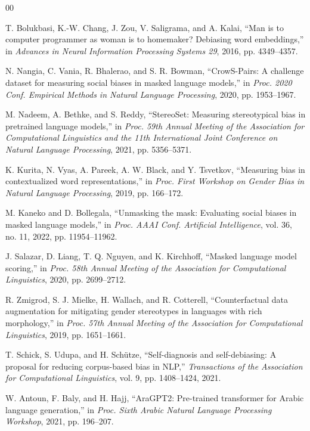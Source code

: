 \documentclass[conference]{IEEEtran}
\begin{document}
\begin{thebibliography}{00}

T. Bolukbasi, K.-W. Chang, J. Zou, V. Saligrama, and A. Kalai, ``Man is to computer programmer as woman is to homemaker? Debiasing word embeddings,'' in \textit{Advances in Neural Information Processing Systems 29}, 2016, pp. 4349--4357.

N. Nangia, C. Vania, R. Bhalerao, and S. R. Bowman, ``CrowS-Pairs: A challenge dataset for measuring social biases in masked language models,'' in \textit{Proc. 2020 Conf. Empirical Methods in Natural Language Processing}, 2020, pp. 1953--1967.

M. Nadeem, A. Bethke, and S. Reddy, ``StereoSet: Measuring stereotypical bias in pretrained language models,'' in \textit{Proc. 59th Annual Meeting of the Association for Computational Linguistics and the 11th International Joint Conference on Natural Language Processing}, 2021, pp. 5356--5371.

K. Kurita, N. Vyas, A. Pareek, A. W. Black, and Y. Tsvetkov, ``Measuring bias in contextualized word representations,'' in \textit{Proc. First Workshop on Gender Bias in Natural Language Processing}, 2019, pp. 166--172.

M. Kaneko and D. Bollegala, ``Unmasking the mask: Evaluating social biases in masked language models,'' in \textit{Proc. AAAI Conf. Artificial Intelligence}, vol. 36, no. 11, 2022, pp. 11954--11962.

J. Salazar, D. Liang, T. Q. Nguyen, and K. Kirchhoff, ``Masked language model scoring,'' in \textit{Proc. 58th Annual Meeting of the Association for Computational Linguistics}, 2020, pp. 2699--2712.

R. Zmigrod, S. J. Mielke, H. Wallach, and R. Cotterell, ``Counterfactual data augmentation for mitigating gender stereotypes in languages with rich morphology,'' in \textit{Proc. 57th Annual Meeting of the Association for Computational Linguistics}, 2019, pp. 1651--1661.

T. Schick, S. Udupa, and H. Schütze, ``Self-diagnosis and self-debiasing: A proposal for reducing corpus-based bias in NLP,'' \textit{Transactions of the Association for Computational Linguistics}, vol. 9, pp. 1408--1424, 2021.

W. Antoun, F. Baly, and H. Hajj, ``AraGPT2: Pre-trained transformer for Arabic language generation,'' in \textit{Proc. Sixth Arabic Natural Language Processing Workshop}, 2021, pp. 196--207.


\end{thebibliography}
\end{document}
